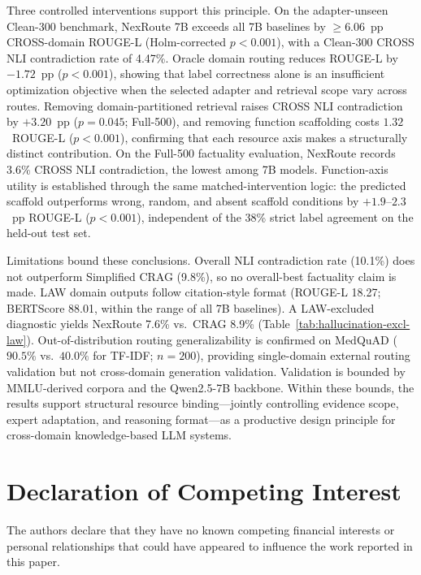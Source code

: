 \documentclass[a4paper,fleql,doubleblind]{cas-sc}
\begin{document}
Three controlled interventions support this principle.
On the adapter-unseen Clean-300 benchmark, NexRoute 7B exceeds all 7B baselines by
${\geq}6.06$~pp CROSS-domain ROUGE-L (Holm-corrected $p{<}0.001$), with a
Clean-300 CROSS NLI contradiction rate of 4.47\%.
Oracle domain routing reduces ROUGE-L by $-1.72$~pp ($p{<}0.001$), showing that
label correctness alone is an insufficient optimization objective when the selected
adapter and retrieval scope vary across routes.
Removing domain-partitioned retrieval raises CROSS NLI contradiction by $+3.20$~pp
($p{=}0.045$; Full-500), and removing function scaffolding costs $1.32$~ROUGE-L
($p{<}0.001$), confirming that each resource axis makes a structurally distinct
contribution.
On the Full-500 factuality evaluation, NexRoute records 3.6\% CROSS NLI contradiction,
the lowest among 7B models.
Function-axis utility is established through the same matched-intervention logic:
the predicted scaffold outperforms wrong, random, and absent scaffold conditions
by $+1.9$--$2.3$~pp ROUGE-L ($p{<}0.001$), independent of the 38\% strict label
agreement on the held-out test set.

Limitations bound these conclusions.
Overall NLI contradiction rate (10.1\%) does not outperform Simplified CRAG (9.8\%),
so no overall-best factuality claim is made.
LAW domain outputs follow citation-style format (ROUGE-L 18.27; BERTScore 88.01,
within the range of all 7B baselines).
A LAW-excluded diagnostic yields NexRoute 7.6\% vs.\ CRAG 8.9\%
(Table~\ref{tab:hallucination-excl-law}).
Out-of-distribution routing generalizability is confirmed on MedQuAD ($90.5\%$
vs.\ $40.0\%$ for TF-IDF; $n{=}200$), providing single-domain external routing
validation but not cross-domain generation validation.
Validation is bounded by MMLU-derived corpora and the Qwen2.5-7B backbone.
Within these bounds, the results support structural resource binding---jointly
controlling evidence scope, expert adaptation, and reasoning format---as a
productive design principle for cross-domain knowledge-based LLM systems.

\section*{Declaration of Competing Interest}
The authors declare that they have no known competing financial interests or
personal relationships that could have appeared to influence the work reported
in this paper.
\end{document}
